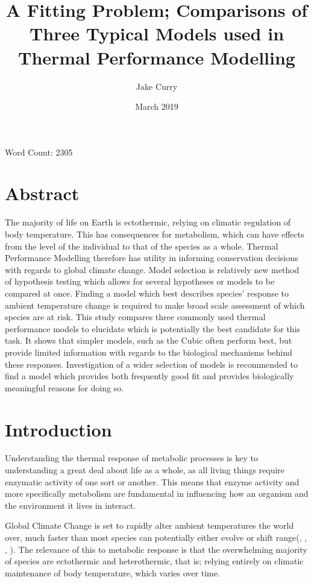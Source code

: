 \documentclass[11pt]{article}
\title{A Fitting Problem; Comparisons of Three Typical Models used in Thermal Performance Modelling}
\author{Jake Curry }
\affil{Department of Life Sciences, Imperial College London}
\date{March 2019}
\begin{document}
\maketitle
\begin{center}
   Word Count: 2305
\end{center}
\newpage
\section{Abstract }
The majority of life on Earth is ectothermic, relying on climatic regulation of body temperature. This has consequences for metabolism, which can have effects from the level of the individual to that of the species as a whole.
Thermal Performance Modelling therefore has utility in informing conservation decisions with regards to global climate change. Model selection is relatively new method of hypothesis testing which allows for several hypotheses or models to be compared at once. Finding a model which best describes species' response to ambient temperature change is required to make broad scale assessment of which species are at risk. 
This study compares three commonly used thermal performance models to elucidate which is potentially the best candidate for this task. It shows that simpler models, such as the Cubic often perform best, but provide limited information with regards to the biological mechanisms behind these responses. Investigation of a wider selection of models is recommended to find a model which provides both frequently good fit and provides biologically meaningful reasons for doing so. 

\section{Introduction}
Understanding the thermal response of metabolic processes is key to understanding a great deal about life as a whole, as all living things require enzymatic activity of one sort or another. This means that enzyme activity and more specifically metabolism are fundamental in influencing how an organism and the environment it lives in interact. 

Global Climate Change is set to rapidly alter ambient temperatures the world over, much faster than most species can potentially either evolve or shift range(\cite{Visser2008}, \cite{Thomas2012}, \cite{Jaeschke2013}, \cite{Gilman2010} ). The relevance of this to metabolic response is that the overwhelming majority of species are ectothermic and heterothermic, that is; relying entirely on climatic maintenance of body temperature, which varies over time.  
\end{document}
